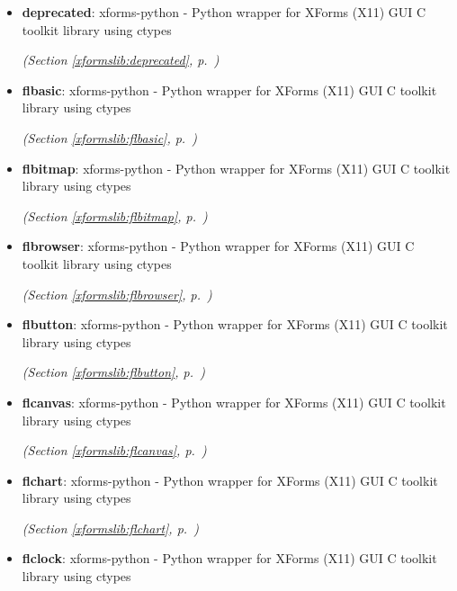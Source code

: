 \begin{itemize}
\setlength{\parskip}{0ex}
\item \textbf{deprecated}: 
xforms-python - Python wrapper for XForms (X11) GUI C toolkit library
using ctypes




  \textit{(Section \ref{xformslib:deprecated}, p.~\pageref{xformslib:deprecated})}

\item \textbf{flbasic}: 
xforms-python - Python wrapper for XForms (X11) GUI C toolkit library
using ctypes




  \textit{(Section \ref{xformslib:flbasic}, p.~\pageref{xformslib:flbasic})}

\item \textbf{flbitmap}: 
xforms-python - Python wrapper for XForms (X11) GUI C toolkit library
using ctypes




  \textit{(Section \ref{xformslib:flbitmap}, p.~\pageref{xformslib:flbitmap})}

\item \textbf{flbrowser}: 
xforms-python - Python wrapper for XForms (X11) GUI C toolkit library
    using ctypes




  \textit{(Section \ref{xformslib:flbrowser}, p.~\pageref{xformslib:flbrowser})}

\item \textbf{flbutton}: 
xforms-python - Python wrapper for XForms (X11) GUI C toolkit library
using ctypes




  \textit{(Section \ref{xformslib:flbutton}, p.~\pageref{xformslib:flbutton})}

\item \textbf{flcanvas}: 
xforms-python - Python wrapper for XForms (X11) GUI C toolkit library
using ctypes




  \textit{(Section \ref{xformslib:flcanvas}, p.~\pageref{xformslib:flcanvas})}

\item \textbf{flchart}: 
xforms-python - Python wrapper for XForms (X11) GUI C toolkit library
using ctypes




  \textit{(Section \ref{xformslib:flchart}, p.~\pageref{xformslib:flchart})}

\item \textbf{flclock}: 
xforms-python - Python wrapper for XForms (X11) GUI C toolkit library
using ctypes





\end{itemize}
